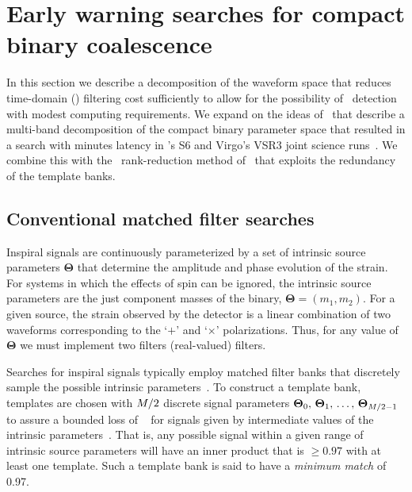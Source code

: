 \section{Early warning searches for compact binary coalescence}
\label{sec:method}

In this section we describe a decomposition of the \CBC{} waveform space that
reduces time-domain (\TD) filtering cost sufficiently to allow for the
possibility of \earlywarning\ detection with modest computing requirements.  We
expand on the ideas of~\citep{Marion2004, Buskulic2010} that describe a
multi-band decomposition of the compact binary parameter space that resulted in
a search with minutes latency in \LIGO{}'s S6 and Virgo's VSR3 joint science
runs~\citep{HugheyGWPAW2011}.  We combine this with the \SVD\ rank-reduction
method of~\citep{Cannon:2010p10398} that exploits the redundancy of
the template banks.

\subsection{Conventional \CBC{} matched filter searches}

Inspiral signals are continuously parameterized by a set of intrinsic source
parameters $\mathbf\Theta$ that determine the amplitude and phase evolution of the
\GW{} strain. For systems in which the effects of spin can be ignored, the intrinsic
source parameters are the just component masses of the binary,
 $\mathbf\Theta = (m_1, m_2)$. For a given source, the strain observed by the
 detector is a linear combination of two waveforms corresponding to the
`$+$' and `$\times$' \GW{} polarizations.  Thus, for any value of
$\mathbf\Theta$ we must implement two filters (real-valued) filters.

Searches for inspiral signals typically employ matched filter
banks that discretely sample the possible intrinsic parameters~\citep{findchirppaper}.
To construct a template bank, templates are chosen with
$M/2$ discrete signal parameters $\mathbf\Theta_0,\, \mathbf\Theta_1,\, \dots,\,
\mathbf\Theta_{M/2-1}$ to assure a bounded loss of \SNR~ for signals given by
intermediate values of the intrinsic parameters~\citep{Owen:1998dk}. That
is, any possible signal within a given range of intrinsic
source parameters will have an inner product that is $\geqslant 0.97$ with at
least one template. Such a template bank is said to have a {\em minimum match}
of 0.97.

